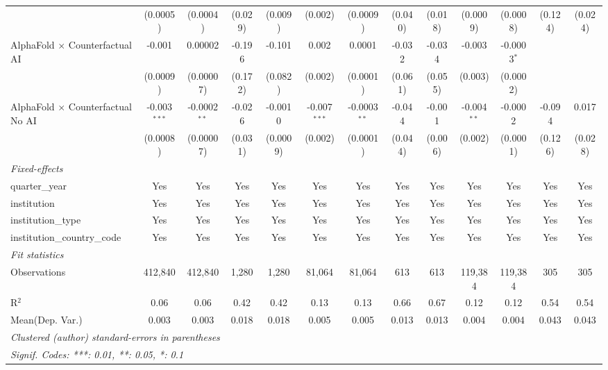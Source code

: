 \begin{tabular}{lcccccccccccc}
                                            & (0.0005)       & (0.0004)       & (0.029) & (0.009)  & (0.002)        & (0.0009)       & (0.040) & (0.018) & (0.0009)      & (0.0008)      & (0.124) & (0.024)\\   
   AlphaFold $\times$ Counterfactual AI     & -0.001         & 0.00002        & -0.196  & -0.101   & 0.002          & 0.0001         & -0.032  & -0.034  & -0.003        & -0.0003$^{*}$ &         &   \\   
                                            & (0.0009)       & (0.00007)      & (0.172) & (0.082)  & (0.002)        & (0.0001)       & (0.061) & (0.055) & (0.003)       & (0.0002)      &         &   \\   
   AlphaFold $\times$ Counterfactual No AI  & -0.003$^{***}$ & -0.0002$^{**}$ & -0.026  & -0.0010  & -0.007$^{***}$ & -0.0003$^{**}$ & -0.044  & -0.001  & -0.004$^{**}$ & -0.0002       & -0.094  & 0.017\\   
                                            & (0.0008)       & (0.00007)      & (0.031) & (0.0009) & (0.002)        & (0.0001)       & (0.044) & (0.006) & (0.002)       & (0.0001)      & (0.126) & (0.028)\\   
   \midrule
   \emph{Fixed-effects}\\
   quarter\_year                            & Yes            & Yes            & Yes     & Yes      & Yes            & Yes            & Yes     & Yes     & Yes           & Yes           & Yes     & Yes\\  
   institution                              & Yes            & Yes            & Yes     & Yes      & Yes            & Yes            & Yes     & Yes     & Yes           & Yes           & Yes     & Yes\\  
   institution\_type                        & Yes            & Yes            & Yes     & Yes      & Yes            & Yes            & Yes     & Yes     & Yes           & Yes           & Yes     & Yes\\  
   institution\_country\_code               & Yes            & Yes            & Yes     & Yes      & Yes            & Yes            & Yes     & Yes     & Yes           & Yes           & Yes     & Yes\\  
   \midrule
   \emph{Fit statistics}\\
   Observations                             & 412,840        & 412,840        & 1,280   & 1,280    & 81,064         & 81,064         & 613     & 613     & 119,384       & 119,384       & 305     & 305\\  
   R$^2$                                    & 0.06           & 0.06           & 0.42    & 0.42     & 0.13           & 0.13           & 0.66    & 0.67    & 0.12          & 0.12          & 0.54    & 0.54\\  
Mean(Dep. Var.) & 0.003 & 0.003 & 0.018 & 0.018 & 0.005 & 0.005 & 0.013 & 0.013 & 0.004 & 0.004 & 0.043 & 0.043 \\
   \midrule \midrule
   \multicolumn{13}{l}{\emph{Clustered (author) standard-errors in parentheses}}\\
   \multicolumn{13}{l}{\emph{Signif. Codes: ***: 0.01, **: 0.05, *: 0.1}}\\
\end{tabular}
\par\endgroup
